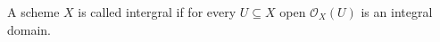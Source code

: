 A scheme $X$ is called intergral if for every $U \subseteq X$ open
$\mathcal{O}_X(U)$ is an integral domain.
